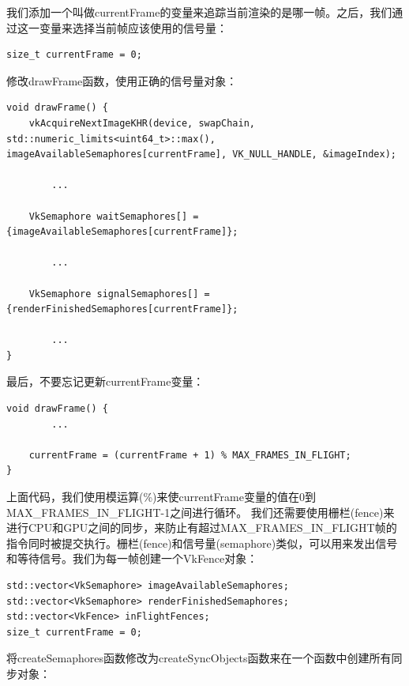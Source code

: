\documentclass{ctexart}
\begin{document}
我们添加一个叫做currentFrame的变量来追踪当前渲染的是哪一帧。之后，我们通过这一变量来选择当前帧应该使用的信号量：

\begin{lstlisting}[language={[ANSI]C}]
size_t currentFrame = 0;
\end{lstlisting}

修改drawFrame函数，使用正确的信号量对象：

\begin{lstlisting}[language={[ANSI]C}]
void drawFrame() {
	vkAcquireNextImageKHR(device, swapChain, std::numeric_limits<uint64_t>::max(), imageAvailableSemaphores[currentFrame], VK_NULL_HANDLE, &imageIndex);

		...

	VkSemaphore waitSemaphores[] = {imageAvailableSemaphores[currentFrame]};

		...

	VkSemaphore signalSemaphores[] = {renderFinishedSemaphores[currentFrame]};

		...
}
\end{lstlisting}

最后，不要忘记更新currentFrame变量：

\begin{lstlisting}[language={[ANSI]C}]
void drawFrame() {
		...

	currentFrame = (currentFrame + 1) % MAX_FRAMES_IN_FLIGHT;
}
\end{lstlisting}

上面代码，我们使用模运算(\%)来使currentFrame变量的值在0到MAX\_FRAMES\_IN\_FLIGHT-1之间进行循环。
我们还需要使用栅栏(fence)来进行CPU和GPU之间的同步，来防止有超过MAX\_FRAMES\_IN\_FLIGHT帧的指令同时被提交执行。栅栏(fence)和信号量(semaphore)类似，可以用来发出信号和等待信号。我们为每一帧创建一个VkFence对象：

\begin{lstlisting}[language={[ANSI]C}]
std::vector<VkSemaphore> imageAvailableSemaphores;
std::vector<VkSemaphore> renderFinishedSemaphores;
std::vector<VkFence> inFlightFences;
size_t currentFrame = 0;
\end{lstlisting}

将createSemaphores函数修改为createSyncObjects函数来在一个函数中创建所有同步对象：
\end{document}
